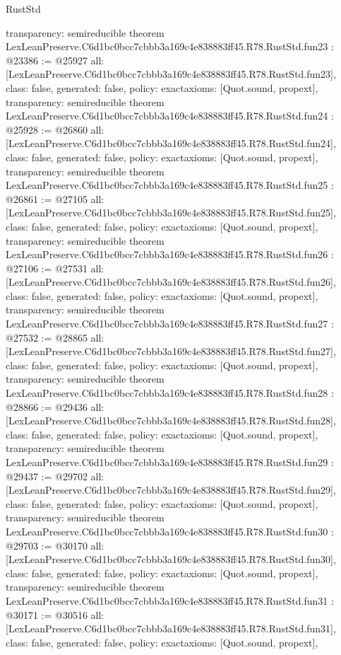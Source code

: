 \begin{lexlean}{RustStd}
\begin{coremodule}
{  transparency: semireducible
}
theorem LexLeanPreserve.C6d1bc0bcc7cbbb3a169c4e838883ff45.R78.RustStd.fun23 : @23386 := @25927 {
  all: [LexLeanPreserve.C6d1bc0bcc7cbbb3a169c4e838883ff45.R78.RustStd.fun23],
  class: false,
  generated: false,
  policy: exact{axioms: [Quot.sound, propext]},
  transparency: semireducible
}
theorem LexLeanPreserve.C6d1bc0bcc7cbbb3a169c4e838883ff45.R78.RustStd.fun24 : @25928 := @26860 {
  all: [LexLeanPreserve.C6d1bc0bcc7cbbb3a169c4e838883ff45.R78.RustStd.fun24],
  class: false,
  generated: false,
  policy: exact{axioms: [Quot.sound, propext]},
  transparency: semireducible
}
theorem LexLeanPreserve.C6d1bc0bcc7cbbb3a169c4e838883ff45.R78.RustStd.fun25 : @26861 := @27105 {
  all: [LexLeanPreserve.C6d1bc0bcc7cbbb3a169c4e838883ff45.R78.RustStd.fun25],
  class: false,
  generated: false,
  policy: exact{axioms: [Quot.sound, propext]},
  transparency: semireducible
}
theorem LexLeanPreserve.C6d1bc0bcc7cbbb3a169c4e838883ff45.R78.RustStd.fun26 : @27106 := @27531 {
  all: [LexLeanPreserve.C6d1bc0bcc7cbbb3a169c4e838883ff45.R78.RustStd.fun26],
  class: false,
  generated: false,
  policy: exact{axioms: [Quot.sound, propext]},
  transparency: semireducible
}
theorem LexLeanPreserve.C6d1bc0bcc7cbbb3a169c4e838883ff45.R78.RustStd.fun27 : @27532 := @28865 {
  all: [LexLeanPreserve.C6d1bc0bcc7cbbb3a169c4e838883ff45.R78.RustStd.fun27],
  class: false,
  generated: false,
  policy: exact{axioms: [Quot.sound, propext]},
  transparency: semireducible
}
theorem LexLeanPreserve.C6d1bc0bcc7cbbb3a169c4e838883ff45.R78.RustStd.fun28 : @28866 := @29436 {
  all: [LexLeanPreserve.C6d1bc0bcc7cbbb3a169c4e838883ff45.R78.RustStd.fun28],
  class: false,
  generated: false,
  policy: exact{axioms: [Quot.sound, propext]},
  transparency: semireducible
}
theorem LexLeanPreserve.C6d1bc0bcc7cbbb3a169c4e838883ff45.R78.RustStd.fun29 : @29437 := @29702 {
  all: [LexLeanPreserve.C6d1bc0bcc7cbbb3a169c4e838883ff45.R78.RustStd.fun29],
  class: false,
  generated: false,
  policy: exact{axioms: [Quot.sound, propext]},
  transparency: semireducible
}
theorem LexLeanPreserve.C6d1bc0bcc7cbbb3a169c4e838883ff45.R78.RustStd.fun30 : @29703 := @30170 {
  all: [LexLeanPreserve.C6d1bc0bcc7cbbb3a169c4e838883ff45.R78.RustStd.fun30],
  class: false,
  generated: false,
  policy: exact{axioms: [Quot.sound, propext]},
  transparency: semireducible
}
theorem LexLeanPreserve.C6d1bc0bcc7cbbb3a169c4e838883ff45.R78.RustStd.fun31 : @30171 := @30516 {
  all: [LexLeanPreserve.C6d1bc0bcc7cbbb3a169c4e838883ff45.R78.RustStd.fun31],
  class: false,
  generated: false,
  policy: exact{axioms: [Quot.sound, propext]},
}
\end{coremodule}
\end{lexlean}
